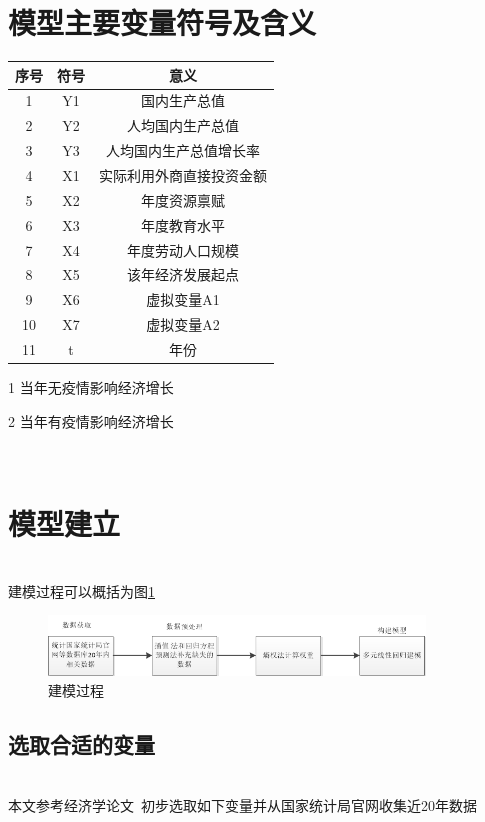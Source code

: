 \documentclass[UTF8]{article}
\begin{document}
	\section{模型主要变量符号及含义}
	\begin{center}
		\begin{threeparttable}
		\setlength{\tabcolsep}{10mm}
		\begin{tabular}{ccc}
		\hline
		序号 & 符号 & 意义\\
		\hline
		1 & Y1 & 国内生产总值\\
		2 & Y2 & 人均国内生产总值\\
		3 & Y3 & 人均国内生产总值增长率\\
		4 & X1 & 实际利用外商直接投资金额\\
		5 & X2 & 年度资源禀赋\\
		6 & X3 & 年度教育水平\\
		7 & X4 & 年度劳动人口规模\\
		8 & X5 & 该年经济发展起点\\
		9 & X6 & 虚拟变量A1\tnote{1}\\
		10 & X7 & 虚拟变量A2\tnote{2}\\
		11 & t & 年份\\
		\hline
		\end{tabular}
	\begin{tablenotes}
		\item [1] 当年无疫情影响经济增长
		\item [2] 当年有疫情影响经济增长
	\end{tablenotes}
\end{threeparttable}
	\end{center}
~\\
	\section{模型建立}
	\vspace{-10pt}
	~\\建模过程可以概括为图\ref{jmgc}
	\begin{figure}[htb]
	\centering
	\includegraphics[width=10cm]{pictures/jmgc.png}
	\caption{建模过程}
	\label{jmgc}
	\end{figure}
	\subsection{选取合适的变量}
	\vspace{-10pt}
	~\\本文参考经济学论文~\cite{kaldor1957model}初步选取如下变量并从国家统计局官网\cite{NBS}收集近20年数据
\end{document}
